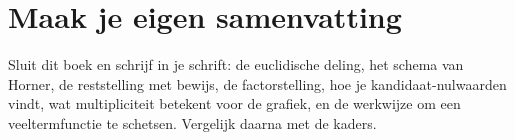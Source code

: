 

\begin{oefeningen}

\end{oefeningen}


\begin{oefeningen}





\end{oefeningen}


\ifzelfstudie
\section*{Maak je eigen samenvatting}
Sluit dit boek en schrijf in je schrift: de euclidische deling, het schema van Horner, de reststelling met bewijs, de factorstelling, hoe je kandidaat-nulwaarden vindt, wat multipliciteit betekent voor de grafiek, en de werkwijze om een veeltermfunctie te schetsen. Vergelijk daarna met de kaders.
\fi
